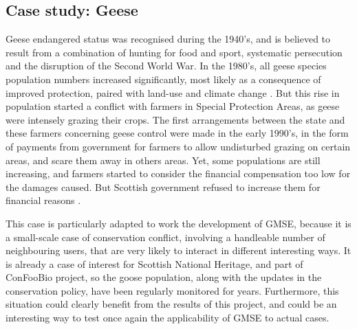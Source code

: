 \documentclass[12pt,a4paper]{article}
\begin{document}
\subsection{Case study: Geese}

Geese endangered status was recognised during the 1940's, and is believed to result from a combination of hunting for food and sport, systematic persecution and the disruption of the Second World War.
In the 1980's, all geese species population numbers increased significantly, most likely as a consequence of improved protection, paired with land-use and climate change \citep{mason2017changing}.
But this rise in population started a conflict with farmers in Special Protection Areas, as geese were intensely grazing their crops.
The first arrangements between the state and these farmers concerning geese control were made in the early 1990's, in the form of payments from government for farmers to allow undisturbed grazing on certain areas, and scare them away in others areas.
Yet, some populations are still increasing, and farmers started to consider the financial compensation too low for the damages caused.
But Scottish government refused to increase them for financial reasons \citep{bainbridge2017goose}.

This case is particularly adapted to work the development of GMSE, because it is a small-scale case of conservation conflict, involving a handleable number of neighbouring users, that are very likely to interact in different interesting ways.
It is already a case of interest for Scottish National Heritage, and part of ConFooBio project, so the goose population, along with the updates in the conservation policy, have been regularly monitored for years.
Furthermore, this situation could clearly benefit from the results of this project, and could be an interesting way to test once again the applicability of GMSE to actual cases.
\end{document}
